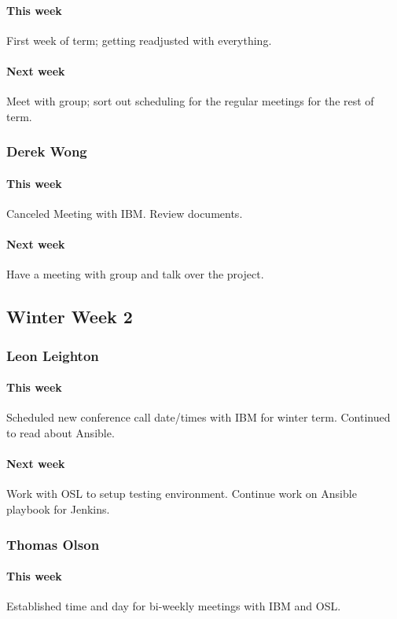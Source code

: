 \documentclass[10pt,letterpaper,onecolumn,draftclsnofoot]{IEEEtran}
\begin{document}
\paragraph{This week}First week of term; getting readjusted with everything.
\paragraph{Next week}Meet with group; sort out scheduling for the regular meetings for the rest of term.


\subsubsection{Derek Wong}
\paragraph{This week}Canceled Meeting with IBM\@. Review documents.
\paragraph{Next week}Have a meeting with group and talk over the project.


\subsection{Winter Week 2}
\subsubsection{Leon Leighton}
\paragraph{This week}Scheduled new conference call date/times with IBM for winter term.   
Continued to read about Ansible.
\paragraph{Next week}Work with OSL to setup testing environment.  
Continue work on Ansible playbook for Jenkins.


\subsubsection{Thomas Olson}
\paragraph{This week}Established time and day for bi-weekly meetings with IBM and OSL.
\end{document}
